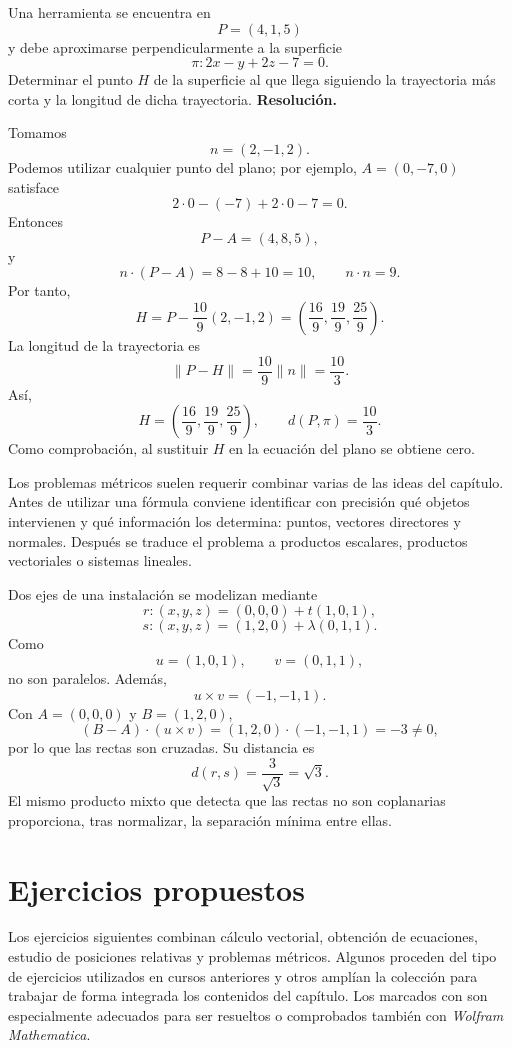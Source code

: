 \begin{solvedexercise}
Una herramienta se encuentra en
\[
P=(4,1,5)
\]
y debe aproximarse perpendicularmente a la superficie
\[
\pi:2x-y+2z-7=0.
\]
Determinar el punto $H$ de la superficie al que llega siguiendo la trayectoria más corta y la longitud de dicha trayectoria.
\tcblower
\textbf{Resolución.}\par\smallskip
Tomamos
\[
n=(2,-1,2).
\]
Podemos utilizar cualquier punto del plano; por ejemplo, $A=(0,-7,0)$ satisface
\[
2\cdot0-(-7)+2\cdot0-7=0.
\]
Entonces
\[
P-A=(4,8,5),
\]
y
\[
n\cdot(P-A)=8-8+10=10,
\qquad
n\cdot n=9.
\]
Por tanto,
\[
H=P-\frac{10}{9}(2,-1,2)
=\left(\frac{16}{9},\frac{19}{9},\frac{25}{9}\right).
\]
La longitud de la trayectoria es
\[
\|P-H\|
=\frac{10}{9}\|n\|
=\frac{10}{3}.
\]
Así,
\[
\boxed{
H=\left(\frac{16}{9},\frac{19}{9},\frac{25}{9}\right),
\qquad
d(P,\pi)=\frac{10}{3}.}
\]
Como comprobación, al sustituir $H$ en la ecuación del plano se obtiene cero.
\end{solvedexercise}

Los problemas métricos suelen requerir combinar varias de las ideas del capítulo. Antes de utilizar una fórmula conviene identificar con precisión qué objetos intervienen y qué información los determina: puntos, vectores directores y normales. Después se traduce el problema a productos escalares, productos vectoriales o sistemas lineales.

\begin{example}
Dos ejes de una instalación se modelizan mediante
\[
r:(x,y,z)=(0,0,0)+t(1,0,1),
\]
\[
s:(x,y,z)=(1,2,0)+\lambda(0,1,1).
\]
Como
\[
u=(1,0,1),\qquad v=(0,1,1),
\]
no son paralelos. Además,
\[
u\times v=(-1,-1,1).
\]
Con $A=(0,0,0)$ y $B=(1,2,0)$,
\[
(B-A)\cdot(u\times v)
=(1,2,0)\cdot(-1,-1,1)=-3\neq0,
\]
por lo que las rectas son cruzadas. Su distancia es
\[
d(r,s)
=\frac{3}{\sqrt3}
=\boxed{\sqrt3}.
\]
El mismo producto mixto que detecta que las rectas no son coplanarias proporciona, tras normalizar, la separación mínima entre ellas.
\end{example}

\section*{Ejercicios propuestos}

Los ejercicios siguientes combinan cálculo vectorial, obtención de ecuaciones, estudio de posiciones relativas y problemas métricos. Algunos proceden del tipo de ejercicios utilizados en cursos anteriores y otros amplían la colección para trabajar de forma integrada los contenidos del capítulo. Los marcados con \M son especialmente adecuados para ser resueltos o comprobados también con \textit{Wolfram Mathematica}.

